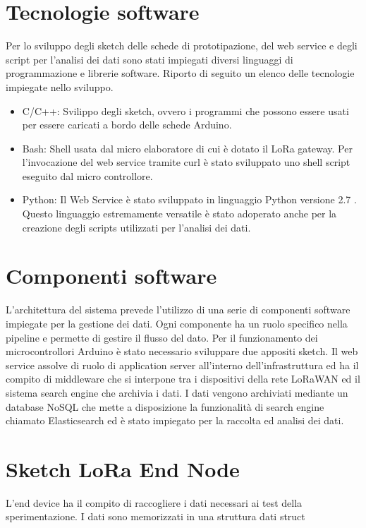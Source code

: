\documentclass[12pt,a4paper,openright,twoside]{report}
\begin{document}
\section{Tecnologie software}
Per lo sviluppo degli sketch delle schede di prototipazione, del web service e degli script per l'analisi dei dati sono stati impiegati diversi linguaggi di programmazione e librerie software. Riporto di seguito un elenco delle tecnologie impiegate nello sviluppo.
\begin{itemize}
    \item C/C++: Svilippo degli sketch, ovvero i programmi che possono essere usati per essere caricati a bordo delle schede Arduino. 
    \item Bash: Shell usata dal micro elaboratore di cui \`e dotato il LoRa gateway. Per l'invocazione del web service tramite curl \`e stato sviluppato uno shell script eseguito dal micro controllore.
    \item Python: Il Web Service \`e stato sviluppato in linguaggio Python versione 2.7 . Questo linguaggio estremamente versatile \`e stato adoperato anche per la creazione degli scripts utilizzati per l'analisi dei dati.
\end{itemize}



\section{Componenti software}
L'architettura del sistema prevede l'utilizzo di una serie di componenti software impiegate per la gestione dei dati. Ogni componente ha un ruolo specifico nella pipeline e permette di gestire il flusso del dato. Per il funzionamento dei microcontrollori Arduino \`e stato necessario sviluppare due appositi sketch. Il web service assolve di ruolo di application server all'interno dell'infrastruttura ed ha il compito di middleware che si interpone tra i dispositivi della rete LoRaWAN ed il sistema search engine che archivia i dati.
I dati vengono  archiviati mediante un database NoSQL che mette a disposizione la funzionalit\`a di search engine chiamato Elasticsearch ed \`e stato impiegato per la raccolta ed analisi dei dati.  

\section{Sketch LoRa End Node}
L'end device ha il compito di raccogliere i dati necessari ai test della sperimentazione. I dati sono memorizzati in una struttura dati struct
\end{document}
